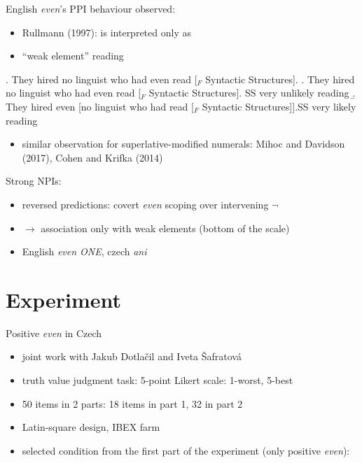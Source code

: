 \documentclass[ignorenonframetext,]{beamer}
\providecommand{\tightlist}{%
  \setlength{\itemsep}{0pt}\setlength{\parskip}{0pt}}
\begin{document}
\begin{frame}

English \emph{even}'s PPI behaviour observed:

\begin{itemize}
\tightlist
\item
  Rullmann (1997): \Next is interpreted only as \Next[b]  
\item
  ``weak element'' reading
\end{itemize}

\ex. They hired no linguist who had even read {[}\(_F\) Syntactic
Structures{]}. \a. They hired no linguist who had even read {[}\(_F\)
Syntactic Structures{]}. \hfill SS very unlikely reading \b. They hired
even {[}no linguist who had read {[}\(_F\) Syntactic
Structures{]}{]}.\hfill SS very likely reading

\begin{itemize}
\tightlist
\item
  similar observation for superlative-modified numerals: Mihoc and
  Davidson (2017), Cohen and Krifka (2014)
\end{itemize}

\end{frame}

\begin{frame}

Strong NPIs:

\begin{itemize}
\tightlist
\item
  reversed predictions: covert \emph{even} scoping over intervening
  \(\neg\)
\item
  \(\rightarrow\) association only with weak elements (bottom of the
  scale)
\item
  English \emph{even ONE}, czech \emph{ani}
\end{itemize}

\end{frame}

\begin{frame}

\end{frame}

\section{Experiment}\label{experiment}

\begin{frame}{Positive \emph{even} in Czech}

\begin{itemize}
\tightlist
\item
  joint work with Jakub Dotlačil and Iveta Šafratová
\item
  truth value judgment task: 5-point Likert scale: 1-worst, 5-best
\item
  50 items in 2 parts: 18 items in part 1, 32 in part 2
\item
  Latin-square design, IBEX farm
\item
  selected condition from the first part of the experiment (only
  positive \emph{even}):
\end{itemize}

\end{frame}
\end{document}
